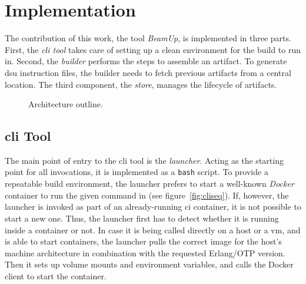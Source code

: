 \section{Implementation}

The contribution of this work, the tool \emph{BeamUp}, is implemented in three parts. First, the \emph{\acrfull{cli} tool} takes care of setting up a clean environment for the build to run in. Second, the \emph{builder} performs the  steps to assemble an artifact. To generate \acrshort{dsu} instruction files, the builder needs to fetch previous artifacts from a central location. The third component, the \emph{store}, manages the lifecycle of artifacts.

\begin{figure}[h]
  \centering
  \caption{Architecture outline.}\label{fig:impl}
\end{figure}

\subsection{\acrlong{cli} Tool}

The main point of entry to the \acrshort{cli} tool is the \emph{launcher}. Acting as the starting point for all invocations, it is implemented as a \lstinline|bash| script. To provide a repeatable build environment, the launcher prefers to start a well-known \emph{Docker} container to run the given command in (see figure~\ref{fig:cliseq}). If, however, the launcher is invoked as part of an already-running \acrshort{ci} container, it is not possible to start a new one. Thus, the launcher first has to detect whether it is running inside a container or not. In case it is being called directly on a host or a \acrshort{vm}, and is able to start containers, the launcher pulls the correct image for the host's machine architecture in combination with the requested Erlang/OTP version. Then it sets up volume mounts and environment variables, and calls the Docker client to start the container.

